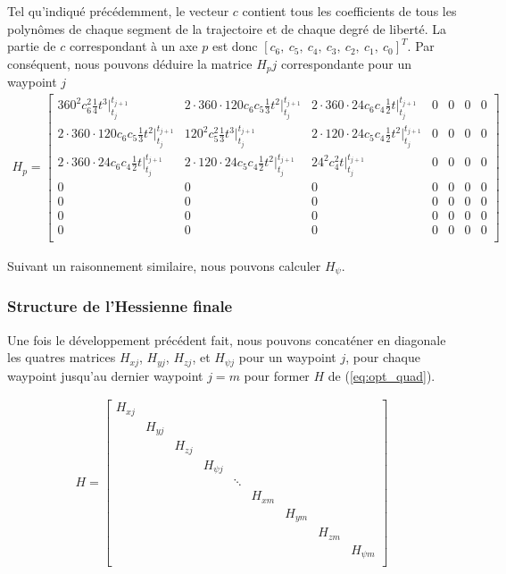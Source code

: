 \documentclass{article}
\begin{document}
Tel qu'indiqué précédemment, le vecteur $c$ contient tous les coefficients de tous les polynômes de chaque segment de la trajectoire et de chaque degré de liberté. La partie de $c$ correspondant à un axe $p$ est donc $[c_6,\ c_5,\ c_4,\ c_3,\ c_2,\ c_1,\ c_0]^T$. Par conséquent, nous pouvons déduire la matrice $H_pj$ correspondante pour un waypoint $j$
\begin{align*}
H_p =
\begin{bmatrix}
    360^2 c_6^2 \frac{1}{4} t^3 \Big|_{t_j}^{t_{j+1}}
    	& 2 \cdot 360 \cdot 120 c_6 c_5 \frac{1}{3} t^2\Big|_{t_j}^{t_{j+1}}
    	& 2 \cdot 360 \cdot 24 c_6 c_4 \frac{1}{2} t\Big|_{t_j}^{t_{j+1}}
    	& 0
    	& 0
    	& 0
    	& 0 \\
    2 \cdot 360 \cdot 120 c_6 c_5 \frac{1}{3} t^2\Big|_{t_j}^{t_{j+1}}
    	& 120^2 c_5^2 \frac{1}{3} t^3\Big|_{t_j}^{t_{j+1}} 
    	& 2 \cdot 120 \cdot 24 c_5 c_4 \frac{1}{2}t^2 \Big|_{t_j}^{t_{j+1}} & 0 & 0 & 0 & 0\\
	2 \cdot 360 \cdot 24 c_6 c_4 \frac{1}{2} t\Big|_{t_j}^{t_{j+1}}
		& 2 \cdot 120 \cdot 24 c_5 c_4 \frac{1}{2}t^2 \Big|_{t_j}^{t_{j+1}} 
		& 24^2 c_4^2 t\Big|_{t_j}^{t_{j+1}} & 0 & 0 & 0 & 0 \\
    0 & 0 & 0 & 0 & 0 & 0 & 0 \\
    0 & 0 & 0 & 0 & 0 & 0 & 0 \\
    0 & 0 & 0 & 0 & 0 & 0 & 0 \\
    0 & 0 & 0 & 0 & 0 & 0 & 0 \\
\end{bmatrix}
\end{align*}

Suivant un raisonnement similaire, nous pouvons calculer $H_\psi$.

\subsubsection{Structure de l'Hessienne finale}

Une fois le développement précédent fait, nous pouvons concaténer en diagonale les quatres matrices $H_{xj}$, $H_{yj}$, $H_{zj}$, et $H_{\psi j}$ pour un waypoint $j$, pour chaque waypoint jusqu'au dernier waypoint $j=m$ pour former $H$ de (\ref{eq:opt_quad}).

\begin{align}
H=
\begin{bmatrix}
	H_{xj} \\
	&	H_{yj} \\
	&	&		H_{zj} \\
	&	&		&		H_{\psi j} \\
	&	&		&		&			\ddots \\
	&	&		&		&			&		H_{xm} \\
	&	&		&		&			&		&		H_{ym} \\
	&	&		&		&			&		&		&		H_{zm} \\
	&	&		&		&			&		&		&		&		H_{\psi m} \\
\end{bmatrix}
\end{align}
\end{document}
